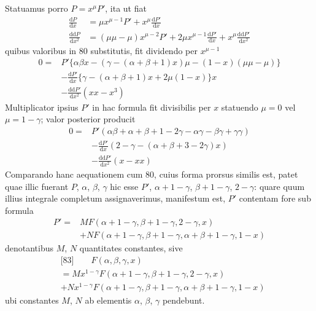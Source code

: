 
Statuamus porro $P=x^\mu P'$, ita ut fiat
\[
\begin{aligned}
\frac{\mathrm{d}P}{\mathrm{d}x}&=\mu x^{\mu-1}P'+x^\mu\frac{\mathrm{d}P'}{\mathrm{d}x}\\
\frac{\mathrm{dd}P}{\mathrm{d}x^2}&=(\mu\mu-\mu)x^{\mu-2}P'+2\mu x^{\mu-1}\frac{\mathrm{d}P'}{\mathrm{d}x}+x^\mu\frac{\mathrm{dd}P'}{\mathrm{d}x^2}
\end{aligned}
\]
quibus valoribus in 80 substitutis, fit dividendo per $x^{\mu-1}$
\[
\begin{aligned}
0={}&P'\{\alpha\beta x-(\gamma-(\alpha+\beta+1)x)\mu-(1-x)(\mu\mu-\mu)\}\\
&-\frac{\mathrm{d}P'}{\mathrm{d}x}\{\gamma-(\alpha+\beta+1)x+2\mu(1-x)\}x\\
&-\frac{\mathrm{dd}P'}{\mathrm{d}x^2}(xx-x^3)
\end{aligned}
\]
Multiplicator ipsius $P'$ in hac formula fit divisibilis per $x$ statuendo $\mu=0$ vel $\mu=1-\gamma$; valor posterior producit
\[
\begin{aligned}
0={}&P'(\alpha\beta+\alpha+\beta+1-2\gamma-\alpha\gamma-\beta\gamma+\gamma\gamma)\\
&-\frac{\mathrm{d}P'}{\mathrm{d}x}(2-\gamma-(\alpha+\beta+3-2\gamma)x)\\
&-\frac{\mathrm{dd}P'}{\mathrm{d}x^2}(x-xx)
\end{aligned}
\]
Comparando hanc aequationem cum 80, cuius forma prorsus similis est, patet quae illic fuerant $P$, $\alpha$, $\beta$, $\gamma$ hic esse $P'$, $\alpha+1-\gamma$, $\beta+1-\gamma$, $2-\gamma$: quare quum illius integrale completum assignaverimus, manifestum est, $P'$ contentam fore sub formula
\[
\begin{aligned}
P'={}&MF(\alpha+1-\gamma,\beta+1-\gamma,2-\gamma,x)\\
&+NF(\alpha+1-\gamma,\beta+1-\gamma,\alpha+\beta+1-\gamma,1-x)
\end{aligned}
\]
denotantibus $M$, $N$ quantitates constantes, sive
\[
\begin{aligned}
&\text{[83]}\qquad F(\alpha,\beta,\gamma,x)\\&=Mx^{1-\gamma}F(\alpha+1-\gamma,\beta+1-\gamma,2-\gamma,x)\\
&+Nx^{1-\gamma}F(\alpha+1-\gamma,\beta+1-\gamma,\alpha+\beta+1-\gamma,1-x)
\end{aligned}
\]
ubi constantes $M$, $N$ ab elementis $\alpha$, $\beta$, $\gamma$ pendebunt.

